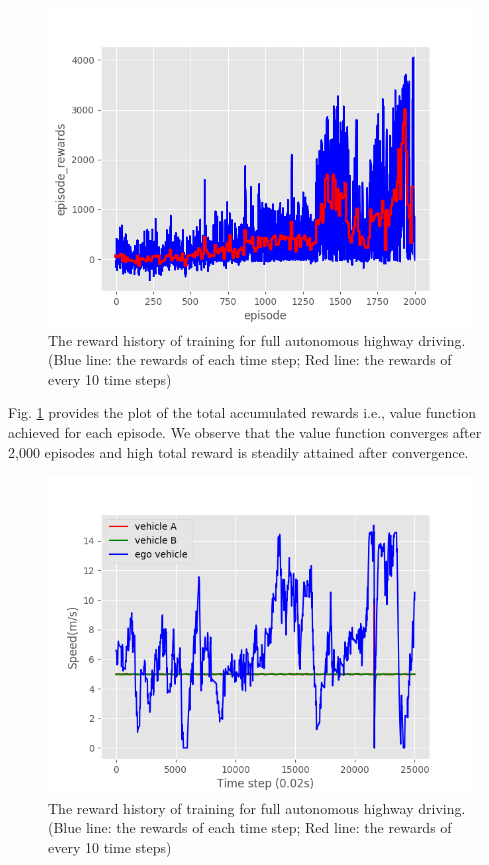 \begin{figure}[h]
\centering
\includegraphics[width=1.0\textwidth]{figs/ch5/auto-reward}
\caption{The reward history of training for full autonomous highway driving. (Blue line: the rewards of each time step; Red line: the rewards of every 10 time steps)}
\label{fig:auto}
\end{figure}

Fig. \ref{fig:auto} provides the plot of the total accumulated rewards i.e., value function achieved for each episode. We observe that the value function converges after 2,000 episodes and high total reward is steadily attained after convergence.

\begin{figure}[h]
\centering
\includegraphics[width=1.0\textwidth]{figs/ch5/auto_vel}
\caption{The reward history of training for full autonomous highway driving. (Blue line: the rewards of each time step; Red line: the rewards of every 10 time steps)}
\label{fig:auto-vel}
\end{figure}

